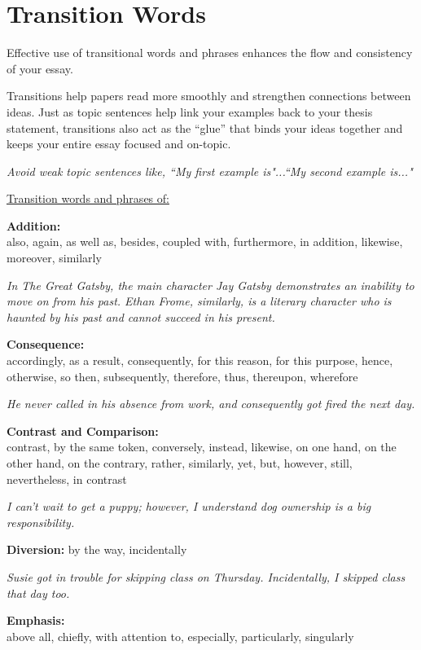 \section{Transition Words}
Effective use of transitional words and phrases enhances the flow and consistency of your essay. 

\bigskip
Transitions help papers read more smoothly and strengthen connections between ideas.  Just as topic sentences help link your examples back to your thesis statement, transitions also act as the “glue” that binds your ideas together and keeps your entire essay focused and on-topic.

\bigskip
\textit{Avoid weak topic sentences like, ``My first example is"...``My second example is..."}

\bigskip
\underline{Transition words and phrases of:}

\bigskip
\textbf{Addition:}\\
also, again, as well as, besides, coupled with, furthermore, in addition, likewise, moreover, similarly

\bigskip
\textit{In The Great Gatsby, the main character Jay Gatsby demonstrates an inability to move on from his past.  Ethan Frome, similarly, is a literary character who is haunted by his past and cannot succeed in his present.}

\bigskip
\textbf{Consequence:}\\
accordingly, as a result, consequently, for this reason, for this purpose, hence, otherwise, so then, subsequently, therefore, thus, thereupon, wherefore

\bigskip
\textit{He never called in his absence from work, and consequently got fired the next day.}

\bigskip
\textbf{Contrast and Comparison:}\\
contrast, by the same token, conversely, instead, likewise, on one hand, on the other hand, on the contrary, rather, similarly, yet, but, however, still, nevertheless, in contrast

\bigskip
\textit{I can't wait to get a puppy; however, I understand dog ownership is a big responsibility.}

\bigskip
\textbf{Diversion:}
by the way, incidentally

\bigskip
\textit{Susie got in trouble for skipping class on Thursday.  Incidentally, I skipped class that day too.}

\bigskip
\textbf{Emphasis:}\\
above all, chiefly, with attention to, especially, particularly, singularly

